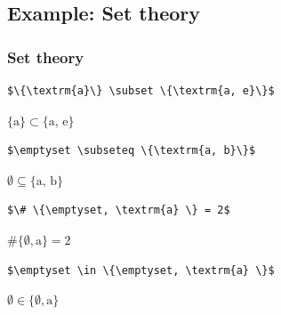 
\subsection{Example: Set theory}

\begin{frame}[fragile]
\frametitle{Set theory}


{\small
\begin{lstlisting}
$\{\textrm{a}\} \subset \{\textrm{a, e}\}$
\end{lstlisting}
}

\ea $\{\textrm{a}\} \subset \{\textrm{a, e}\}$
\z 


{\small
\begin{lstlisting}
$\emptyset \subseteq \{\textrm{a, b}\}$
\end{lstlisting}
}

\ea $\emptyset \subseteq \{\textrm{a, b}\}$
\z 


{\small
\begin{lstlisting}
$\# \{\emptyset, \textrm{a} \} = 2$
\end{lstlisting}
}

\ea $\# \{\emptyset, \textrm{a} \} = 2$
\z 


{\small
\begin{lstlisting}
$\emptyset \in \{\emptyset, \textrm{a} \}$
\end{lstlisting}
}

\ea $\emptyset \in \{\emptyset, \textrm{a} \}$
\z 
\end{frame}


